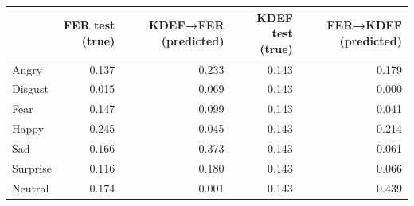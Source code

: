 \begin{tabular}{lrrrr}
\toprule
 & FER test (true) & KDEF→FER (predicted) & KDEF test (true) & FER→KDEF (predicted) \\
\midrule
Angry & 0.137 & 0.233 & 0.143 & 0.179 \\
Disgust & 0.015 & 0.069 & 0.143 & 0.000 \\
Fear & 0.147 & 0.099 & 0.143 & 0.041 \\
Happy & 0.245 & 0.045 & 0.143 & 0.214 \\
Sad & 0.166 & 0.373 & 0.143 & 0.061 \\
Surprise & 0.116 & 0.180 & 0.143 & 0.066 \\
Neutral & 0.174 & 0.001 & 0.143 & 0.439 \\
\bottomrule
\end{tabular}
